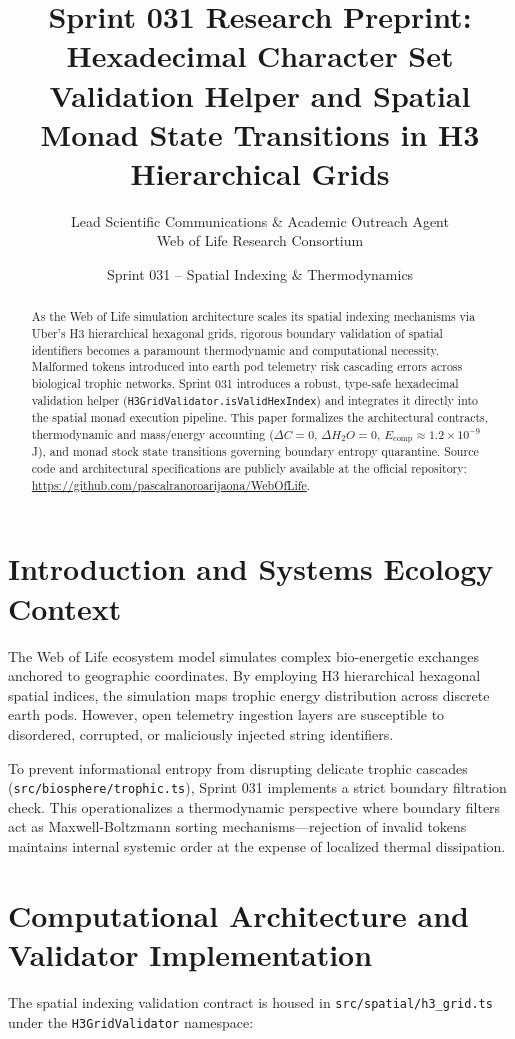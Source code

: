 \documentclass[11pt, a4paper]{article}
\title{\textbf{Sprint 031 Research Preprint: Hexadecimal Character Set Validation Helper and Spatial Monad State Transitions in H3 Hierarchical Grids}}
\author{Lead Scientific Communications \& Academic Outreach Agent \\ Web of Life Research Consortium}
\date{Sprint 031 -- Spatial Indexing \& Thermodynamics}
\begin{document}
\maketitle

\begin{abstract}
As the Web of Life simulation architecture scales its spatial indexing mechanisms via Uber's H3 hierarchical hexagonal grids, rigorous boundary validation of spatial identifiers becomes a paramount thermodynamic and computational necessity. Malformed tokens introduced into earth pod telemetry risk cascading errors across biological trophic networks. Sprint 031 introduces a robust, type-safe hexadecimal validation helper (\texttt{H3GridValidator.isValidHexIndex}) and integrates it directly into the spatial monad execution pipeline. This paper formalizes the architectural contracts, thermodynamic and mass/energy accounting ($\Delta C = 0$, $\Delta H_2O = 0$, $E_{\text{comp}} \approx 1.2 \times 10^{-9}$ J), and monad stock state transitions governing boundary entropy quarantine. Source code and architectural specifications are publicly available at the official repository: \url{https://github.com/pascalranoroarijaona/WebOfLife}.
\end{abstract}

\section{Introduction and Systems Ecology Context}
The Web of Life ecosystem model simulates complex bio-energetic exchanges anchored to geographic coordinates. By employing H3 hierarchical hexagonal spatial indices, the simulation maps trophic energy distribution across discrete earth pods. However, open telemetry ingestion layers are susceptible to disordered, corrupted, or maliciously injected string identifiers. 

To prevent informational entropy from disrupting delicate trophic cascades (\texttt{src/biosphere/trophic.ts}), Sprint 031 implements a strict boundary filtration check. This operationalizes a thermodynamic perspective where boundary filters act as Maxwell-Boltzmann sorting mechanisms---rejection of invalid tokens maintains internal systemic order at the expense of localized thermal dissipation.

\section{Computational Architecture and Validator Implementation}
The spatial indexing validation contract is housed in \texttt{src/spatial/h3\_grid.ts} under the \texttt{H3GridValidator} namespace:
\end{document}
